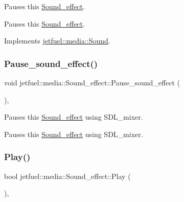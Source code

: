 Pauses this \hyperlink{classjetfuel_1_1media_1_1Sound__effect}{Sound\+\_\+effect}. 

Pauses this \hyperlink{classjetfuel_1_1media_1_1Sound__effect}{Sound\+\_\+effect}. 

Implements \hyperlink{classjetfuel_1_1media_1_1Sound_adb9cd45e23e6224760051e579aeefa7f}{jetfuel\+::media\+::\+Sound}.

\mbox{\label{classjetfuel_1_1media_1_1Sound__effect_a76b2b58d4ca2c1fe9988a4cdc4f96a3d}} 
\subsubsection{\texorpdfstring{Pause\+\_\+sound\+\_\+effect()}{Pause\_sound\_effect()}}
{\footnotesize\ttfamily void jetfuel\+::media\+::\+Sound\+\_\+effect\+::\+Pause\+\_\+sound\+\_\+effect (\begin{DoxyParamCaption}{ }\end{DoxyParamCaption})\hspace{0.3cm}{\ttfamily [inline]}, {\ttfamily [protected]}}



Pauses this \hyperlink{classjetfuel_1_1media_1_1Sound__effect}{Sound\+\_\+effect} using S\+D\+L\+\_\+mixer. 

Pauses this \hyperlink{classjetfuel_1_1media_1_1Sound__effect}{Sound\+\_\+effect} using S\+D\+L\+\_\+mixer. \mbox{\label{classjetfuel_1_1media_1_1Sound__effect_a206d3653259cc854fd80fa44a9d333c4}} 
\subsubsection{\texorpdfstring{Play()}{Play()}}
{\footnotesize\ttfamily bool jetfuel\+::media\+::\+Sound\+\_\+effect\+::\+Play (\begin{DoxyParamCaption}{ }\end{DoxyParamCaption})\hspace{0.3cm}{\ttfamily [override]}, {\ttfamily [virtual]}}



